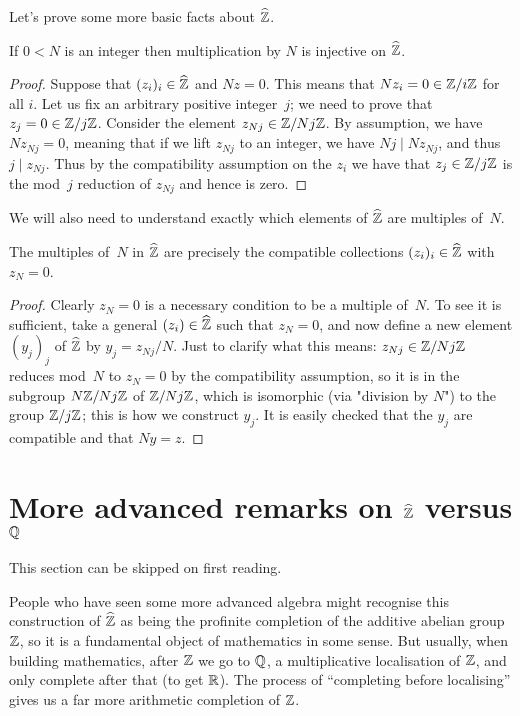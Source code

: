 Let's prove some more basic facts about $\widehat{\mathbb{Z}}$.

\begin{lemma}
    \label{ZHat.torsionfree}
    \leanok
    If $0<N$ is an integer then multiplication by $N$ is injective on $\widehat{\mathbb{Z}}$.
\end{lemma}
\begin{proof}
    \leanok
    Suppose that $(z_i)_i\in\widehat{\mathbb{Z}}$ and $Nz=0$. This means that $Nz_i=0\in\mathbb{Z}/i\mathbb{Z}$ for all $i$.
    Let us fix an arbitrary positive integer~$j$; we need to prove that $z_j=0\in\mathbb{Z}/j\mathbb{Z}$.
    Consider the element $z_{Nj}\in\mathbb{Z}/Nj\mathbb{Z}$. By assumption, we have $Nz_{Nj}=0$, meaning that
    if we lift $z_{Nj}$ to an integer, we have $Nj\mid Nz_{Nj}$, and thus $j\mid z_{Nj}$.
    Thus by the compatibility assumption on the $z_i$ we have that $z_j\in\mathbb{Z}/j\mathbb{Z}$ is the
    mod~$j$ reduction of $z_{Nj}$ and hence is zero.
\end{proof}

We will also need to understand exactly which elements of $\widehat{\mathbb{Z}}$
are multiples of~$N$.

\begin{lemma}
    \label{ZHat.multiples}
    \leanok
    The multiples of~$N$ in $\widehat{\mathbb{Z}}$ are precisely the compatible collections $(z_i)_i\in\widehat{\mathbb{Z}}$
    with $z_N=0$.
\end{lemma}
\begin{proof} \leanok
    Clearly $z_N=0$ is a necessary condition to be a multiple of~$N$. To see it is sufficient,
    take a general $(z_i)\in\widehat{\mathbb{Z}}$ such that $z_N=0$,
    and now define a new element $(y_j)_j$ of $\widehat{\mathbb{Z}}$
    by $y_j=z_{Nj}/N$. Just to clarify what this means: $z_{Nj}\in\mathbb{Z}/Nj\mathbb{Z}$ reduces mod~$N$
    to $z_N=0$ by the compatibility assumption, so it is in the subgroup $N\mathbb{Z}/Nj\mathbb{Z}$ of $\mathbb{Z}/Nj\mathbb{Z}$,
    which is isomorphic (via "division by $N$") to the group $\mathbb{Z}/j\mathbb{Z}$; this is how we construct
    $y_j$. It is easily checked that the $y_j$ are compatible and that $Ny=z$.
\end{proof}

\section{More advanced remarks on \texorpdfstring{$\widehat{\mathbb{Z}}$}{Zhat} versus \texorpdfstring{$\mathbb{Q}$}{Q}}

This section can be skipped on first reading.

People who have seen some more advanced algebra might recognise this construction of $\widehat{\mathbb{Z}}$
as being the profinite completion of the additive abelian group $\mathbb{Z}$, so it is a fundamental
object of mathematics in some sense. But usually, when building mathematics, after $\mathbb{Z}$ we
go to $\mathbb{Q}$, a multiplicative localisation of $\mathbb{Z}$, and only complete after that (to get $\mathbb{R}$).
The process of ``completing before localising'' gives us a far more arithmetic completion
of $\mathbb{Z}$.

